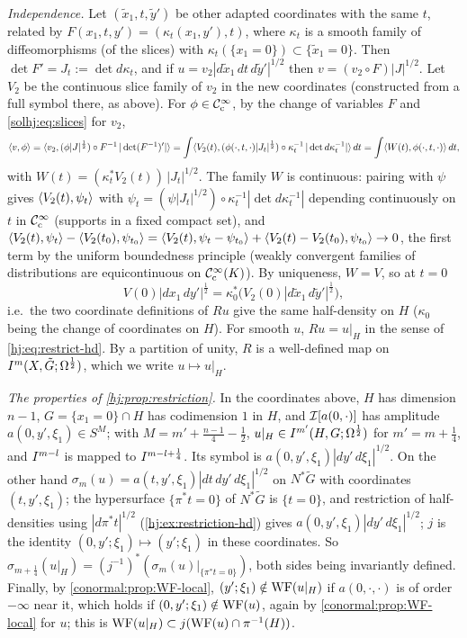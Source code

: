 \emph{Independence.} Let $(\tilde x_1,t,\tilde y')$ be other adapted coordinates with the same
$t$, related by $F(x_1,t,y')=(\kappa_t(x_1,y'),t)$, where $\kappa_t$ is a smooth family of
diffeomorphisms (of the slices) with $\kappa_t(\{x_1=0\})\subset\{\tilde x_1=0\}$. Then
$\det F'=J_t:=\det d\kappa_t$, and if $u=v_2|d\tilde x_1\,dt\,d\tilde y'|^{1/2}$ then
$v=(v_2\circ F)|J|^{1/2}$. Let $V_2$ be the continuous slice family of $v_2$ in the new
coordinates (constructed from a full symbol there, as above). For $\phi\in\mathcal{C}^\infty_{\mathrm{c}}$, by the change
of variables $F$ and \eqref{solhj:eq:slices} for $v_2$,
\begin{equation*}
\langle v, \phi\rangle=\langle v_2, (\phi|J|^{\frac12})\circ F^{-1}\,|\det(F^{-1})'|\rangle
=\int\langle V_2(t), (\phi(\cdot,t,\cdot)|J_t|^{\frac12})\circ\kappa_t^{-1}\,|\det d\kappa_t^{-1}|\rangle
\,dt=\int\langle W(t), \phi(\cdot,t,\cdot)\rangle\,dt,
\end{equation*}
with $W(t)=(\kappa_t^*V_2(t))\,|J_t|^{1/2}$. The family $W$ is continuous: pairing with
$\psi$ gives $\langle V_2(t), \psi_t\rangle$ with $\psi_t=(\psi|J_t|^{1/2})\circ\kappa_t^{-1}
|\det d\kappa_t^{-1}|$ depending continuously on $t$ in $\mathcal{C}^\infty_{\mathrm{c}}$ (supports in a fixed compact
set), and $\langle V_2(t), \psi_t\rangle-\langle V_2(t_0), \psi_{t_0}\rangle=\langle V_2(t), \psi_t-\psi_{t_0}\rangle+
\langle V_2(t)-V_2(t_0), \psi_{t_0}\rangle\to0$, the first term by the uniform boundedness principle
(weakly convergent families of distributions are equicontinuous on $\mathcal{C}^\infty_{\mathrm{c}}(K)$). By uniqueness,
$W=V$, so at $t=0$
\begin{equation*}
V(0)|dx_1\,dy'|^{\frac12}=\kappa_0^*\big(V_2(0)|d\tilde x_1\,d\tilde y'|^{\frac12}\big),
\end{equation*}
i.e.\ the two coordinate definitions of $Ru$ give the same half-density on $H$ ($\kappa_0$
being the change of coordinates on $H$). For smooth $u$, $Ru=u|_H$ in the sense of
\eqref{hj:eq:restrict-hd}. By a partition of unity, $R$ is a well-defined map on
$I^{m}(X,\tilde G;\Omega^{\frac12})$, which we write $u\mapsto u|_H$.

\emph{The properties of \cref{hj:prop:restriction}.} In the coordinates above, $H$ has
dimension $n-1$, $G=\{x_1=0\}\cap H$ has codimension $1$ in $H$, and $\mathcal{I}[a(0,\cdot)]$ has
amplitude $a(0,y',\xi_1)\in S^M$; with $M=m'+\frac{n-1}4-\frac12$, $u|_H\in I^{m'}(H,G;
\Omega^{\frac12})$ for $m'=m+\frac14$, and $I^{m-l}$ is mapped to $I^{m-l+\frac14}$. Its symbol is
$a(0,y',\xi_1)|dy'\,d\xi_1|^{1/2}$. On the other hand $\sigma_m(u)=a(t,y',\xi_1)|dt\,dy'\,
d\xi_1|^{1/2}$ on $N^*\tilde G$ with coordinates $(t,y',\xi_1)$; the hypersurface
$\{\pi^*t=0\}$ of $N^*\tilde G$ is $\{t=0\}$, and restriction of half-densities using
$|d\pi^*t|^{1/2}$ (\cref{hj:ex:restriction-hd}) gives $a(0,y',\xi_1)|dy'\,d\xi_1|^{1/2}$;
$j$ is the identity $(0,y';\xi_1)\mapsto(y';\xi_1)$ in these coordinates. So
$\sigma_{m+\frac14}(u|_H)=(j^{-1})^*(\sigma_m(u)|_{\{\pi^*t=0\}})$, both sides being
invariantly defined. Finally, by \cref{conormal:prop:WF-local}, $(y';\xi_1)\notin
\operatorname{WF}(u|_H)$ if $a(0,\cdot,\cdot)$ is of order $-\infty$ near it, which holds if
$(0,y';\xi_1)\notin\operatorname{WF}(u)$, again by \cref{conormal:prop:WF-local} for $u$; this is
$\operatorname{WF}(u|_H)\subset j(\operatorname{WF}(u)\cap\pi^{-1}(H))$.

